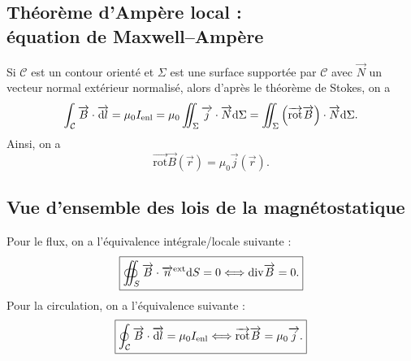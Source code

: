     \subsection[Équation de Maxwell--Ampère]{Théorème d'Ampère local :\\équation de Maxwell--Ampère}

        Si $\mathcal{C}$ est un contour orienté et $\Sigma$ est une surface supportée par $\mathcal{C}$ avec $\vec{N}$ un vecteur normal extérieur normalisé, alors d'après le théorème de Stokes, on a 
        \begin{equation}
            \int_{\mathcal{C}}\protect\overrightarrow{{B}}\cdot\protect\overrightarrow{{\mathrm{d} l}}=\mu_{0}I_{\mathrm{enl}}=\mu_{0}\iint_{\Sigma}\protect\overrightarrow{{j}}\cdot\protect\overrightarrow{{N}}\mathrm{d}\Sigma=\iint_{\Sigma}\left(\protect\overrightarrow{{\mathrm{rot}}}\protect\overrightarrow{{B}}\right)\cdot\protect\overrightarrow{{N}}\mathrm{d}\Sigma.
        \end{equation}
        Ainsi, on a 
        \begin{equation}
            \boxed{
                \vec{\mathrm{rot}}\vec{B}(\vec{r})=\mu_{0}\vec{j}(\vec{r}).
            }
        \end{equation}

    \subsection{Vue d'ensemble des lois de la magnétostatique}

        Pour le flux, on a l'équivalence intégrale/locale suivante :
        \begin{equation}
            \boxed{
                \oiint_{S}\protect\overrightarrow{{B}}\cdot\protect\overrightarrow{{n}}^{\mathrm{ext}}\mathrm{d} S=0\Longleftrightarrow\mathrm{div}\protect\overrightarrow{{B}}=0.
            }
        \end{equation}
        Pour la circulation, on a l'équivalence suivante :
        \begin{equation}
            \boxed{
                \oint_{\mathcal{C}}\protect\overrightarrow{{B}}\cdot\protect\overrightarrow{{\mathrm{d} l}}=\mu_{0}I_{\mathrm{enl}}\Longleftrightarrow\protect\overrightarrow{{\mathrm{rot}}}\protect\overrightarrow{{B}}=\mu_{0}\protect\overrightarrow{{j}}.
            }
        \end{equation}

        
